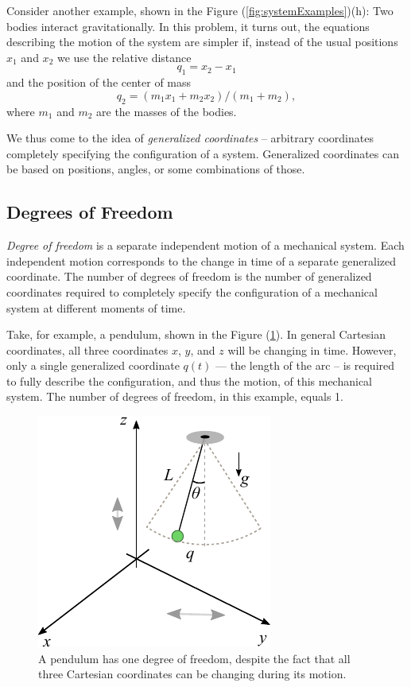 Consider another example, shown in the Figure
(\ref{fig:systemExamples})(h): Two bodies interact
gravitationally. In this problem, it turns out, the equations
describing the motion of the system are simpler if, instead of the
usual positions $x_1$ and $x_2$ we use the relative distance
\begin{equation*}
	q_1 = x_2 - x_1
\end{equation*}
and the position of the center of mass
\begin{equation*}
	q_2 = (m_1x_1 + m_2x_2)/(m_1 + m_2),
\end{equation*}
where $m_1$ and $m_2$ are the masses of the bodies.

We thus come to the idea of \emph{generalized coordinates} --
arbitrary coordinates completely specifying the configuration of a
system. Generalized coordinates can be based on positions, angles, or
some combinations of those.

\subsection{Degrees of Freedom}
\emph{Degree of freedom} is a separate independent motion of a
mechanical system. Each independent motion corresponds to the change
in time
of a separate generalized coordinate. The number of degrees of freedom
is the number of
generalized coordinates required to completely specify the
configuration of a mechanical system at different moments of time.

Take, for example, a pendulum, shown in the Figure
(\ref{fig:degreeOfFreedomPendulum}). In general Cartesian coordinates,
all three coordinates $x$, $y$, and $z$ will be changing in
time. However, only a single generalized coordinate $q(t)$ --- the
length of the arc -- is required to fully describe the configuration,
and thus the motion, of this mechanical system. The number of degrees
of freedom, in this example, equals 1.

\begin{figure}[htbp]
	\centering
	\includegraphics[scale=1.0]{degreeOfFreedomPendulum}
	\caption{A pendulum has one degree of freedom, despite the fact
		that all three Cartesian coordinates can be changing during its motion.}
	\label{fig:degreeOfFreedomPendulum}
\end{figure}




